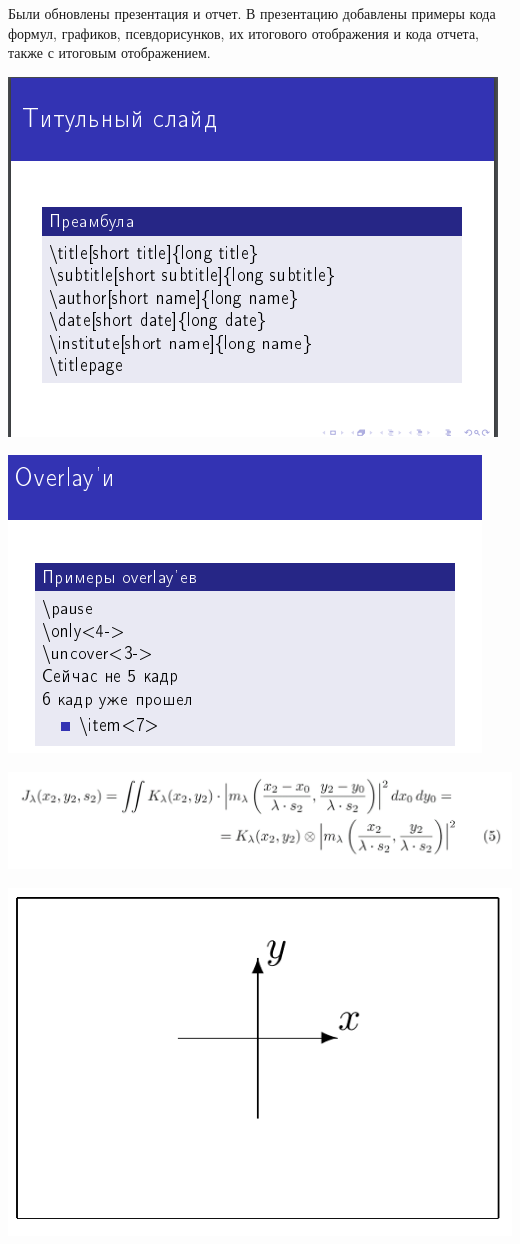 \documentclass{article}
\begin{document}
	Были обновлены презентация и отчет. В презентацию добавлены примеры кода формул, графиков, псевдорисунков, их итогового отображения и кода отчета, также с итоговым отображением.
	
	\includegraphics{9}
	
	\includegraphics[width=\linewidth]{10}
	
	\includegraphics[width=\linewidth]{11}
	
	\includegraphics[width=\linewidth]{12}
	
\end{document}
